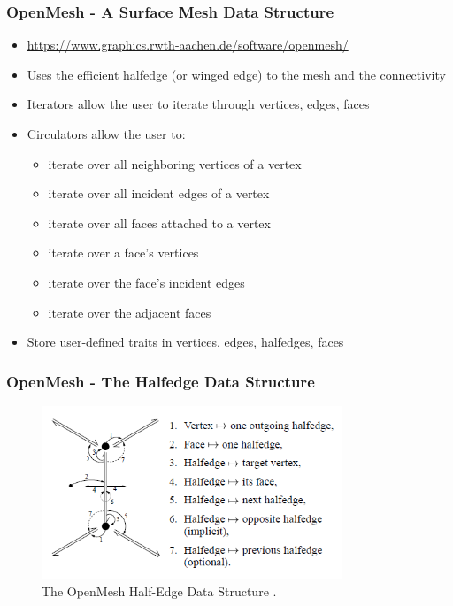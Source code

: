 \begin{frame}
\frametitle{OpenMesh - A Surface Mesh Data Structure}
\begin{itemize}
\item \url{https://www.graphics.rwth-aachen.de/software/openmesh/}
\item Uses the efficient halfedge (or winged edge) to the mesh and the connectivity
\item Iterators allow the user to iterate through vertices, edges, faces
\item Circulators allow the user to:
\begin{itemize}
\item iterate over all neighboring vertices of a vertex
\item iterate over all incident edges of a vertex
\item iterate over all faces attached to a vertex
\item iterate over a face's vertices
\item iterate over the face's incident edges
\item iterate over the adjacent faces
\end{itemize}
\item Store user-defined traits in vertices, edges, halfedges, faces	
\end{itemize}								
\end{frame}

\begin{frame}
\frametitle{OpenMesh - The Halfedge Data Structure}
\begin{figure}[h!]
 \includegraphics[width=0.8\textwidth]{screenshots/half-edge.png}
\caption{The OpenMesh Half-Edge Data Structure \cite{Botsch02openmesh}.}
\end{figure}
\end{frame}

